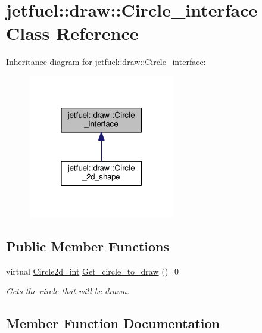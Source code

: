 \hypertarget{classjetfuel_1_1draw_1_1Circle__interface}{}\section{jetfuel\+:\+:draw\+:\+:Circle\+\_\+interface Class Reference}
\label{classjetfuel_1_1draw_1_1Circle__interface}


Inheritance diagram for jetfuel\+:\+:draw\+:\+:Circle\+\_\+interface\+:
\nopagebreak
\begin{figure}[H]
\begin{center}
\leavevmode
\includegraphics[width=181pt]{classjetfuel_1_1draw_1_1Circle__interface__inherit__graph}
\end{center}
\end{figure}
\subsection*{Public Member Functions}
\begin{DoxyCompactItemize}
\item 
virtual \hyperlink{classjetfuel_1_1draw_1_1Circle2d}{Circle2d\+\_\+int} \hyperlink{classjetfuel_1_1draw_1_1Circle__interface_a992a93bc130288ec4c9c4d2fa4203341}{Get\+\_\+circle\+\_\+to\+\_\+draw} ()=0
\begin{DoxyCompactList}\small\item\em Gets the circle that will be drawn. \end{DoxyCompactList}\end{DoxyCompactItemize}


\subsection{Member Function Documentation}
\mbox{\label{classjetfuel_1_1draw_1_1Circle__interface_a992a93bc130288ec4c9c4d2fa4203341}} 
